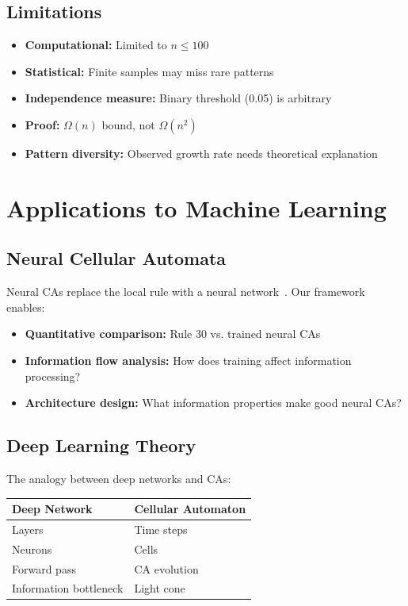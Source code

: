 \documentclass[11pt]{article}
\begin{document}
\subsection{Limitations}

\begin{itemize}
    \item \textbf{Computational:} Limited to $n \leq 100$
    \item \textbf{Statistical:} Finite samples may miss rare patterns
    \item \textbf{Independence measure:} Binary threshold (0.05) is arbitrary
    \item \textbf{Proof:} $\Omega(n)$ bound, not $\Omega(n^2)$
    \item \textbf{Pattern diversity:} Observed growth rate needs theoretical explanation
\end{itemize}

\section{Applications to Machine Learning}

\subsection{Neural Cellular Automata}

Neural CAs replace the local rule with a neural network~\citep{mordvintsev_2020}. Our framework enables:
\begin{itemize}
    \item \textbf{Quantitative comparison:} Rule 30 vs. trained neural CAs
    \item \textbf{Information flow analysis:} How does training affect information processing?
    \item \textbf{Architecture design:} What information properties make good neural CAs?
\end{itemize}

\subsection{Deep Learning Theory}

The analogy between deep networks and CAs:
\begin{center}
\begin{tabular}{@{}ll@{}}
\toprule
Deep Network & Cellular Automaton \\
\midrule
Layers & Time steps \\
Neurons & Cells \\
Forward pass & CA evolution \\
Information bottleneck & Light cone \\
\bottomrule
\end{tabular}
\end{center}
\end{document}

